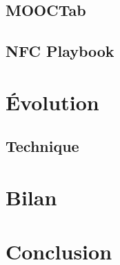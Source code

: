 \documentclass[french,12pt,a4paper,titlepage,openright,openbib]{report}
\begin{document}
\section{MOOCTab}

\lipsum[2-3]

\section{NFC Playbook}

\lipsum[4-5]

\chapter{Évolution}

\section{Technique}

\chapter{Bilan}
\lipsum[6-7]
\chapter{Conclusion}
\lipsum[8-9]

\printglossary[title={Glossaire}]
\end{document}
